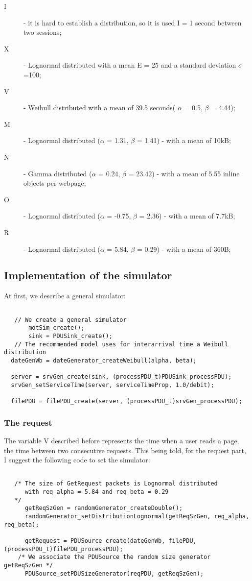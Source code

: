 \begin{description}
 \item[I] - it is hard to establish a distribution, so it is used I = 1 second between two sessions;
 \item[X] - Lognormal distributed with a mean E = 25 and a standard deviation $\sigma$=100;
 \item[V] - Weibull distributed with a mean of 39.5 seconds( $\alpha$ = 0.5, $\beta$ = 4.44);
 \item[M] - Lognormal distributed ($\alpha$ = 1.31, $\beta$ = 1.41) - with a mean of 10kB;
 \item[N] - Gamma distributed ($\alpha$ = 0.24, $\beta$ = 23.42) - with a mean of 5.55 inline objects per webpage;
 \item[O] - Lognormal distributed ($\alpha$ = -0.75, $\beta$ = 2.36) - with a mean of 7.7kB;
 \item[R] - Lognormal distributed ($\alpha$ = 5.84, $\beta$ = 0.29) - with a mean of 360B;
\end{description}

\subsection{Implementation of the simulator}
At first, we describe a general simulator:
\begin{verbatim}

   // We create a general simulator
       motSim_create();          
       sink = PDUSink_create();
   // The recommended model uses for interarrival time a Weibull distribution
  dateGenWb = dateGenerator_createWeibull(alpha, beta);
  
  server = srvGen_create(sink, (processPDU_t)PDUSink_processPDU);
  srvGen_setServiceTime(server, serviceTimeProp, 1.0/debit); 

  filePDU = filePDU_create(server, (processPDU_t)srvGen_processPDU); 

\end{verbatim}

\subsubsection{The request}

The variable V described before represents the time when a user reads a page, the time between two consecutive requests.
 This being told, for the request part, I suggest the following code to set the simulator:

\begin{verbatim}

   /* The size of GetRequest packets is Lognormal distributed 
      with req_alpha = 5.84 and req_beta = 0.29
   */    
      getReqSzGen = randomGenerator_createDouble();
      randomGenerator_setDistributionLognormal(getReqSzGen, req_alpha, req_beta);
      
      getRequest = PDUSource_create(dateGenWb, filePDU, (processPDU_t)filePDU_processPDU); 
    /* We associate the PDUSource the random size generator getReqSzGen */
      PDUSource_setPDUSizeGenerator(reqPDU, getReqSzGen);

\end{verbatim}

